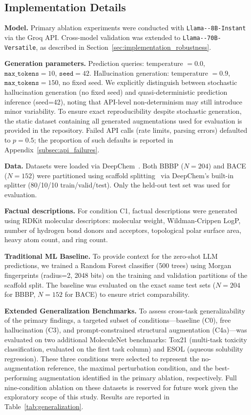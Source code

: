 \subsection{Implementation Details}
\label{sec:implementation}
\textbf{Model.} Primary ablation experiments were conducted with \texttt{Llama--\allowbreak 8B-\allowbreak Instant} via the Groq API. Cross-model validation was extended to \texttt{Llama--\allowbreak 70B-\allowbreak Versatile}, as described in Section~\ref{sec:implementation_robustness}.

\textbf{Generation parameters.} Prediction queries: temperature $= 0.0$, $\texttt{max\_tokens} = 10$, $\texttt{seed} = 42$. Hallucination generation: temperature $= 0.9$, $\texttt{max\_tokens} = 150$, no fixed seed. We explicitly distinguish between stochastic hallucination generation (no fixed seed) and quasi-deterministic prediction inference (seed=42), noting that API-level non-determinism may still introduce minor variability. To ensure exact reproducibility despite stochastic generation, the static dataset containing all generated augmentations used for evaluation is provided in the repository. Failed API calls (rate limits, parsing errors) defaulted to $p = 0.5$; the proportion of such defaults is reported in Appendix~\ref{subsec:api_failures}.

\textbf{Data.} Datasets were loaded via DeepChem~\cite{ramsundar2019deepchem}. Both BBBP ($N=204$) and BACE ($N=152$) were partitioned using scaffold splitting~\cite{bemis1996properties} via DeepChem's built-in splitter (80/10/10 train/valid/test). Only the held-out test set was used for evaluation.

\textbf{Factual descriptions.} For condition C1, factual descriptions were generated using RDKit molecular descriptors: molecular weight, Wildman-Crippen LogP, number of hydrogen bond donors and acceptors, topological polar surface area, heavy atom count, and ring count.

\textbf{Traditional ML Baseline.} To provide context for the zero-shot LLM predictions, we trained a Random Forest classifier (500 trees) using Morgan fingerprints (radius=2, 2048 bits) on the training and validation partitions of the scaffold split. The baseline was evaluated on the exact same test sets ($N=204$ for BBBP, $N=152$ for BACE) to ensure strict comparability.

\textbf{Extended Generalization Benchmarks.} To assess 
cross-task generalizability of the primary findings, a 
targeted subset of conditions---baseline (C0), free 
hallucination (C3), and prompt-constrained structural 
augmentation (C4a)---was evaluated on two additional 
MoleculeNet benchmarks: Tox21 (multi-task toxicity 
classification, evaluated on the first task column) and 
ESOL (aqueous solubility regression). These three 
conditions were selected to represent the no-augmentation 
reference, the maximal perturbation condition, and the 
best-performing augmentation identified in the primary 
ablation, respectively. Full nine-condition ablation on 
these datasets is reserved for future work given the 
exploratory scope of this study. Results are reported in 
Table~\ref{tab:generalization}.

